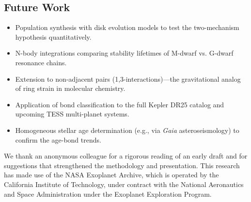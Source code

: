 \documentclass[twocolumn]{aastex631}
\begin{document}
\subsection{Future Work}
\begin{itemize}
  \item Population synthesis with disk evolution models to test the
        two-mechanism hypothesis quantitatively.
  \item N-body integrations comparing stability lifetimes of M-dwarf vs.
        G-dwarf resonance chains.
  \item Extension to non-adjacent pairs (1,3-interactions)---the gravitational
        analog of ring strain in molecular chemistry.
  \item Application of bond classification to the full Kepler DR25 catalog and
        upcoming TESS multi-planet systems.
  \item Homogeneous stellar age determination (e.g., via \textit{Gaia} asteroseismology)
        to confirm the age-bond trends.
\end{itemize}

\begin{acknowledgments}
We thank an anonymous colleague for a rigorous reading of an early draft and
for suggestions that strengthened the methodology and presentation.
This research has made use of the NASA Exoplanet Archive, which is operated by
the California Institute of Technology, under contract with the National
Aeronautics and Space Administration under the Exoplanet Exploration Program.
\end{acknowledgments}



\end{document}

